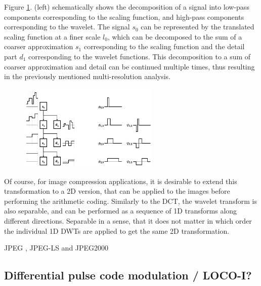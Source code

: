       Figure \ref{fig:wavelet}. (left) schematically shows the decomposition of a signal into low-pass components corresponding to the scaling function, and high-pass components corresponding to the wavelet. The signal $s_0$ can be represented by the translated scaling function at a finer scale $l_0$, which can be decomposed to the sum of a coarser approximation $s_1$ corresponding to the scaling function and the detail part $d_1$ corresponding to the wavelet functions. This decomposition to a sum of coarser approximation and detail can be continued multiple times, thus resulting in the previously mentioned multi-resolution analysis.


      \begin{figure}
        \centering
        \includegraphics[width=0.6\textwidth]{wavelet}
        \label{fig:wavelet}
      \end{figure}


      Of course, for image compression applications, it is desirable to extend this transformation to a 2D version, that can be applied to the images before performing the arithmetic coding. Similarly to the DCT, the wavelet transform is also separable, and can be performed as a sequence of 1D transforms along different directions. Separable in a sense, that it does not matter in which order the individual 1D DWTs are applied to get the same 2D transformation.

      JPEG \cite{pennebaker_jpeg:_1992}, JPEG-LS \cite{weinberger_loco-i_2000} and JPEG2000

  \subsection{Differential pulse code modulation / LOCO-I?}


